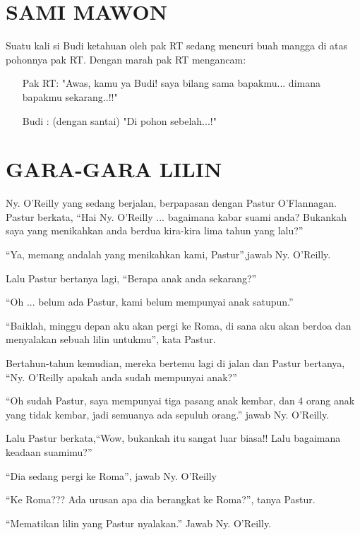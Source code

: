 \small
\section*{SAMI MAWON}
\setlength{\parindent}{0cm}

Suatu kali si Budi ketahuan oleh pak RT sedang mencuri buah mangga di
atas pohonnya pak RT. Dengan marah pak RT mengancam:
\begin{itemize}
\item[Pak RT:] "Awas, kamu ya Budi! saya bilang sama bapakmu...
          dimana bapakmu sekarang..!!"

\item[Budi  :] (dengan santai) "Di pohon sebelah...!"
\end{itemize}


\section*{GARA-GARA LILIN}

Ny. O'Reilly yang sedang berjalan, berpapasan dengan Pastur
O'Flannagan. Pastur berkata, 
``Hai Ny. O'Reilly ... bagaimana kabar
suami anda? Bukankah saya yang menikahkan anda berdua kira-kira lima
tahun yang lalu?'' 

``Ya, memang andalah yang menikahkan kami, Pastur'',jawab Ny. O'Reilly. 

Lalu Pastur bertanya lagi, ``Berapa anak anda
sekarang?'' 

``Oh ... belum ada Pastur, kami belum mempunyai anak
satupun.''
 
``Baiklah, minggu depan aku akan pergi ke Roma, di sana aku
akan berdoa dan menyalakan sebuah lilin untukmu'', kata Pastur.

Bertahun-tahun kemudian, mereka bertemu lagi di jalan dan Pastur
bertanya, ``Ny. O'Reilly apakah anda sudah mempunyai anak?''

``Oh sudah Pastur, saya mempunyai tiga pasang anak kembar, dan 4 orang
anak yang tidak kembar, jadi semuanya ada sepuluh orang.'' jawab Ny.
O'Reilly.

Lalu Pastur berkata,``Wow, bukankah itu sangat luar biasa!! Lalu
bagaimana keadaan suamimu?''

``Dia sedang pergi ke Roma'', jawab Ny. O'Reilly

``Ke Roma??? Ada urusan apa dia berangkat ke Roma?'', tanya Pastur.

``Mematikan lilin yang Pastur nyalakan.'' Jawab Ny. O'Reilly.



\setlength{\parindent}{1cm}
\normalsize